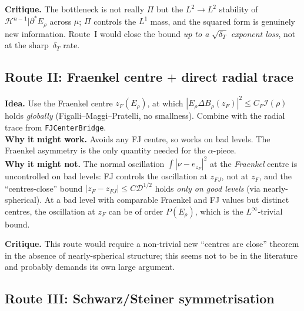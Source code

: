 \documentclass[11pt]{article}
\theoremstyle{definition}
\newcommand{\Hn}{\mathcal H^{n-1}}
\newcommand{\dD}{\mathcal D}
\begin{document}
\textbf{Critique.}  The bottleneck is not really $\Pi$ but the
$L^{2}\to L^{2}$ stability of $\Hn|\partial^{*}E_{\rho}$ across $\mu$;
$\Pi$ controls the $L^{1}$ mass, and the squared form is genuinely
new information.  Route~I would close the bound \emph{up to a
$\sqrt{\delta_{T}}$ exponent loss}, not at the sharp~$\delta_{T}$ rate.

\subsection{Route II: Fraenkel centre $+$ direct radial trace}
\label{ssec:routeII}

\textbf{Idea.}  Use the Fraenkel centre $z_{F}(E_{\rho})$, at which
$|E_{\rho}\Delta B_{\rho}(z_{F})|^{2}\le C_{F}\mathcal I(\rho)$
holds \emph{globally} (Figalli--Maggi--Pratelli, no smallness).
Combine with the radial trace from \texttt{FJCenterBridge}.\\
\textbf{Why it might work.}  Avoids any FJ centre, so works on bad
levels.  The Fraenkel asymmetry is the only quantity needed for the
$\alpha$-piece.\\
\textbf{Why it might not.}  The normal oscillation $\int|\nu-e_{z_{F}}|^{2}$
at the \emph{Fraenkel} centre is uncontrolled on bad levels: FJ
controls the oscillation at $z_{FJ}$, not at $z_{F}$, and the
``centres-close'' bound $|z_{F}-z_{FJ}|\le C\dD^{1/2}$ holds
\emph{only on good levels} (via nearly-spherical).  At a bad level
with comparable Fraenkel and FJ values but distinct centres, the
oscillation at $z_{F}$ can be of order $P(E_{\rho})$, which is the
$L^{\infty}$-trivial bound.

\textbf{Critique.}  This route would require a non-trivial new
``centres are close'' theorem in the absence of nearly-spherical
structure; this seems not to be in the literature and probably
demands its own large argument.

\subsection{Route III: Schwarz/Steiner symmetrisation}\label{ssec:routeIII}
\end{document}
